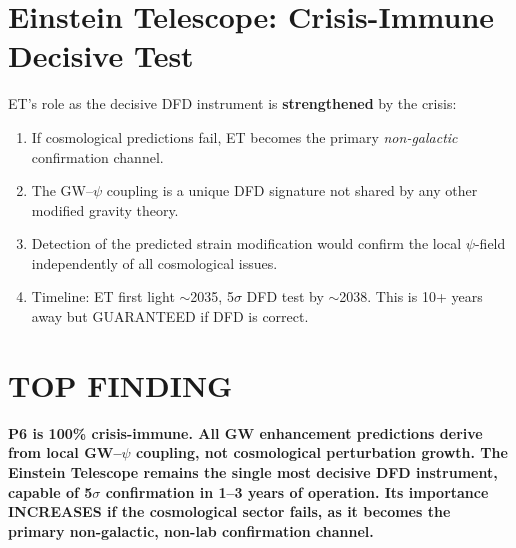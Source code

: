\documentclass[11pt]{article}
\begin{document}
\section{Einstein Telescope: Crisis-Immune Decisive Test}

ET's role as the decisive DFD instrument is \textbf{strengthened} by the
crisis:

\begin{enumerate}
\item If cosmological predictions fail, ET becomes the primary
  \emph{non-galactic} confirmation channel.
\item The GW--$\psi$ coupling is a unique DFD signature not shared
  by any other modified gravity theory.
\item Detection of the predicted strain modification would confirm
  the local $\psi$-field independently of all cosmological issues.
\item Timeline: ET first light $\sim$2035, 5$\sigma$ DFD test by
  $\sim$2038. This is 10+ years away but GUARANTEED if DFD is correct.
\end{enumerate}

\section*{TOP FINDING}

\begin{tcolorbox}[colback=blue!5!white, colframe=blue!70!black]
\textbf{P6 is 100\% crisis-immune. All GW enhancement predictions derive
from local GW--$\psi$ coupling, not cosmological perturbation growth.
The Einstein Telescope remains the single most decisive DFD instrument,
capable of 5$\sigma$ confirmation in 1--3 years of operation. Its
importance INCREASES if the cosmological sector fails, as it becomes
the primary non-galactic, non-lab confirmation channel.}
\end{tcolorbox}
\end{document}
